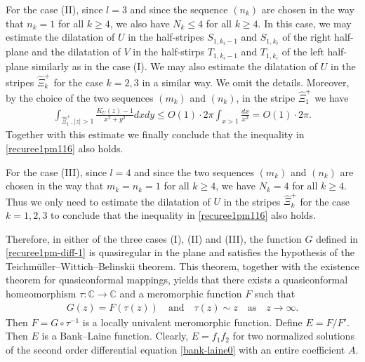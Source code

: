 \documentclass[12pt]{amsart}
\numberwithin{equation}{section}
\begin{document}
For the case (II), since $l=3$ and since the sequence $(n_k)$ are chosen in the way that $n_k=1$ for all $k\geq 4$, we also have $N_k\leq4$ for all $k\geq4$. In this case, we may estimate the dilatation of $U$ in the half-stripes $S_{1,k_i-1}$ and $S_{1,k_i}$ of the right half-plane and the dilatation of $V$ in the half-stirps $T_{1,k_i-1}$ and $T_{1,k_i}$ of the left half-plane similarly as in the case (I). We may also estimate the dilatation of $U$ in the stripes $\hat{\Xi}_k^{+}$ for the case $k=2,3$ in a similar way. We omit the details. Moreover, by the choice of the two sequences $(m_k)$ and $(n_k)$, in the stripe $\hat{\Xi}_1^{+}$ we have
\begin{equation*}%
\begin{split}
\int_{\hat{\Xi}_1^{+},|z|>1}\frac{K_U(z)-1}{x^2+y^2}dxdy\leq O(1)\cdot 2\pi\int_{x>1}\frac{dx}{x^2}=O(1)\cdot 2\pi.
\end{split}
\end{equation*}
Together with this estimate we finally conclude that the inequality in \eqref{recuree1pm116} also holds.

For the case (III), since $l=4$ and since the two sequences $(m_k)$ and $(n_k)$ are chosen in the way that $m_k=n_k=1$ for all $k\geq 4$, we have $N_k=4$ for all $k\geq4$. Thus we only need to estimate the dilatation of $U$ in the stripes $\hat{\Xi}_k^{+}$ for the case $k=1,2,3$ to conclude that the inequality in \eqref{recuree1pm116} also holds.

Therefore, in either of the three cases (I), (II) and (III), the function $G$ defined in \eqref{recuree1pm-diff-1} is quasiregular in the plane and satisfies the hypothesis of the Teichm\"uller--Wittich--Belinskii theorem. This theorem, together with the existence theorem for quasiconformal mappings, yields that there exists a quasiconformal homeomorphism $\tau:\mathbb{C}\to\mathbb{C}$ and a meromorphic function $F$ such that
\begin{equation}\label{recuree1pm117 final-8}
\begin{split}
G(z)=F(\tau(z)) \quad  \text{and} \quad \tau(z)\sim z \quad \text{as} \quad z\to\infty.
\end{split}
\end{equation}
Then $F=G\circ \tau^{-1}$ is a locally univalent meromorphic function. Define $E=F/F'$. Then $E$ is a Bank--Laine function. Clearly, $E=f_1f_2$ for two normalized solutions of the second order differential equation \eqref{bank-laine0} with an entire coefficient $A$.
\end{document}
